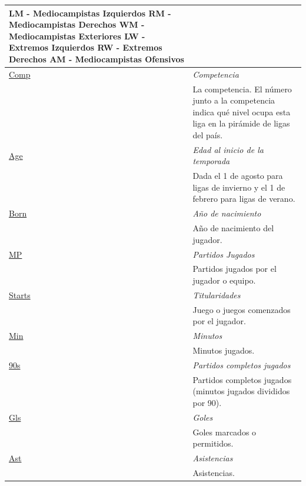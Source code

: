 \documentclass[a4paper,11pt]{article}
\theoremstyle{definition}
\begin{document}
\begin{longtable}{|l|p{12cm}|}
          \newline LM - Mediocampistas Izquierdos
          \newline RM - Mediocampistas Derechos
          \newline WM - Mediocampistas Exteriores
          \newline LW - Extremos Izquierdos
          \newline RW - Extremos Derechos
          \newline AM - Mediocampistas Ofensivos \\
        \hline
        \hyperlink{tooltip:Comp}{Comp} & \textit{Competencia} \\
        & La competencia. El número junto a la competencia indica qué nivel ocupa esta liga en la pirámide de ligas del país. \\
        \hline
        \hyperlink{tooltip:Age}{Age} & \textit{Edad al inicio de la temporada} \\
        & Dada el 1 de agosto para ligas de invierno y el 1 de febrero para ligas de verano. \\
        \hline
        \hyperlink{tooltip:Born}{Born} & \textit{Año de nacimiento} \\
        & Año de nacimiento del jugador. \\
        \hline
        \hyperlink{tooltip:MP}{MP} & \textit{Partidos Jugados} \\
        & Partidos jugados por el jugador o equipo. \\
        \hline
        \hyperlink{tooltip:Starts}{Starts} & \textit{Titularidades} \\
        & Juego o juegos comenzados por el jugador. \\
        \hline
        \hyperlink{tooltip:Min}{Min} & \textit{Minutos} \\
        & Minutos jugados. \\
        \hline
        \hyperlink{tooltip:90s}{90s} & \textit{Partidos completos jugados} \\
        & Partidos completos jugados (minutos jugados divididos por 90). \\
        \hline
        \hyperlink{tooltip:Gls}{Gls} & \textit{Goles} \\
        & Goles marcados o permitidos. \\
        \hline
        \hyperlink{tooltip:Ast}{Ast} & \textit{Asistencias} \\
        & Asistencias. \\
        \hline

\end{longtable}
\end{document}
